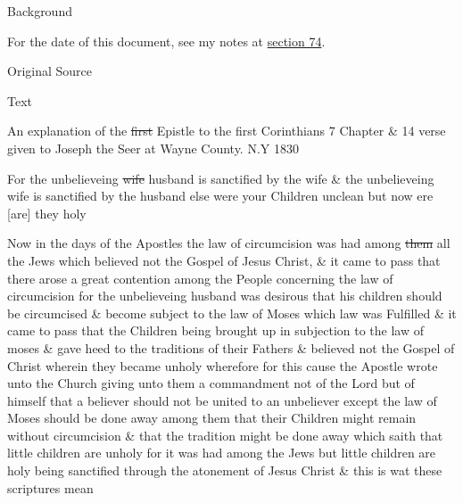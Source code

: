 			\begin{description}
				\item[Background]
			\end{description}
			
				For the date of this document, see my notes at \hyperref[DC74]{section 74}.
			
			
			\begin{description}
				\item[Original Source]
			\end{description}
			
			
			\begin{description}
				\item[Text]
			\end{description}
			
				An explanation of the \sout{first} Epistle to the first Corinthians 7 Chapter \& 14 verse given to Joseph the Seer at Wayne County. N.Y 1830
				
				For the unbelieveing \sout{wife} husband is sanctified by the wife \& the unbelieveing wife is sanctified by the husband else were your Children unclean but now ere [are] they holy
				
				Now in the days of the Apostles the law of circumcision was had among \sout{them} all the Jews which believed not the Gospel of Jesus Christ, \& it came to pass that there arose a great contention among the People concerning the law of circumcision for the unbelieveing husband was desirous that his children should be circumcised \& become subject to the law of Moses which law was Fulfilled \& it came to pass that the Children being brought up in subjection to the law of moses \& gave heed to the traditions of their Fathers \& believed not the Gospel of Christ wherein they became unholy wherefore for this cause the Apostle wrote unto the Church giving unto them a commandment not of the Lord but of himself that a believer should not be united to an unbeliever except the law of Moses should be done away among them that their Children might remain without circumcision \& that the tradition might be done away which saith that little children are unholy for it was had among the Jews but little children are holy being sanctified through the atonement of Jesus Christ \& this is wat these scriptures mean
			
\pagebreak{}
